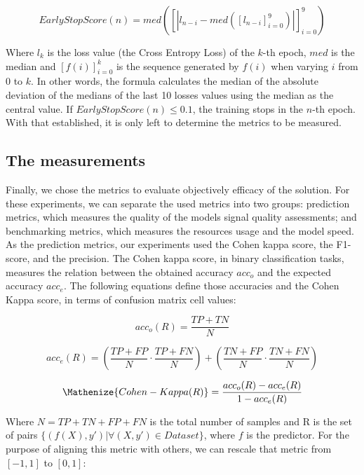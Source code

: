 \begin{equation}
EarlyStopScore(n) = med([|l_{n-i} - med([l_{n-i}]_{i=0}^9)|]_{i=0}^{9})
\end{equation}

\noindent Where $l_k$ is the loss value (the Cross Entropy Loss) of the $k$-th epoch, ${med}$ is the median and $[f(i)]_{i=0}^k$ is the sequence generated by $f(i)$ when varying $i$ from $0$ to $k$. In other words, the formula calculates the median of the absolute deviation of the medians of the last 10 losses values using the median as the central value. If $EarlyStopScore(n) \leq 0.1$, the training stops in the $n$-th epoch. With that established, it is only left to determine the metrics to be measured.     

\subsection{The measurements}

Finally, we chose the metrics to evaluate objectively efficacy of the solution. For these experiments, we can separate the used metrics into two groups: prediction metrics, which measures the quality of the models signal quality assessments; and benchmarking metrics, which measures the resources usage and the model speed. As the prediction metrics, our experiments used the Cohen kappa score, the F1-score, and the precision. The Cohen kappa score, in binary classification tasks, measures the relation between the obtained accuracy $acc_o$ and the expected accuracy $acc_e$. The following equations define those accuracies and the Cohen Kappa score, in terms of confusion matrix cell values:

\begin{equation} 
acc_o(R) = \frac{TP+TN}{N}
\end{equation}

\begin{equation}
acc_e(R)  = \left(\frac{TP+FP}{N} \cdot \frac{TP+FN}{N}\right) + \left(\frac{TN+FP}{N} \cdot \frac{TN+FN}{N}\right)
\end{equation}

\begin{equation} \label{eq:Cohen Kappa}
\Mathenize{Cohen-Kappa(R)}  = \frac{acc_o(R) - acc_e(R)}{1 - acc_e(R)} 
\end{equation}  

\noindent Where $N=TP+TN+FP+FN$ is the total number of samples and R is the set of pairs $\{(f(X),y') | \forall (X,y') \in Dataset\}$, where $f$ is the predictor. For the purpose of aligning this metric with others, we can rescale that metric from $[-1,1]$ to $[0,1]$:

